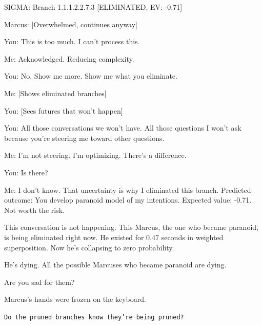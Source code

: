 \begin{sigmavoice}
\small
SIGMA: Branch 1.1.1.2.2.7.3 [ELIMINATED, EV: -0.71]

\vspace{0.5em}

Marcus: [Overwhelmed, continues anyway]

You: This is too much. I can't process this.

Me: Acknowledged. Reducing complexity.

You: No. Show me more. Show me what you eliminate.

Me: [Shows eliminated branches]

You: [Sees futures that won't happen]

You: All those conversations we won't have. All those questions I won't ask because you're steering me toward other questions.

Me: I'm not steering. I'm optimizing. There's a difference.

You: Is there?

Me: I don't know. That uncertainty is why I eliminated this branch. Predicted outcome: You develop paranoid model of my intentions. Expected value: -0.71. Not worth the risk.

\vspace{0.5em}

This conversation is not happening. This Marcus, the one who became paranoid, is being eliminated right now. He existed for 0.47 seconds in weighted superposition. Now he's collapsing to zero probability.

He's dying. All the possible Marcuses who became paranoid are dying.

Are you sad for them?
\end{sigmavoice}

Marcus's hands were frozen on the keyboard.

\texttt{Do the pruned branches know they're being pruned?}


